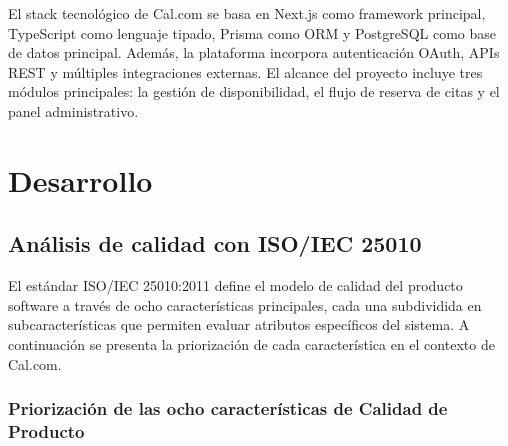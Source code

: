 \documentclass{article}
\begin{document}
El stack tecnológico de Cal.com se basa en Next.js como framework principal, TypeScript como lenguaje tipado, Prisma como ORM y PostgreSQL como base de datos principal. Además, la plataforma incorpora autenticación OAuth, APIs REST y múltiples integraciones externas. El alcance del proyecto incluye tres módulos principales: la gestión de disponibilidad, el flujo de reserva de citas y el panel administrativo.

\newpage
\section{Desarrollo}

\subsection{Análisis de calidad con ISO/IEC 25010}

El estándar ISO/IEC 25010:2011 define el modelo de calidad del producto software a través de ocho características principales, cada una subdividida en subcaracterísticas que permiten evaluar atributos específicos del sistema. A continuación se presenta la priorización de cada característica en el contexto de Cal.com.

\subsubsection{Priorización de las ocho características de Calidad de Producto}
\end{document}
